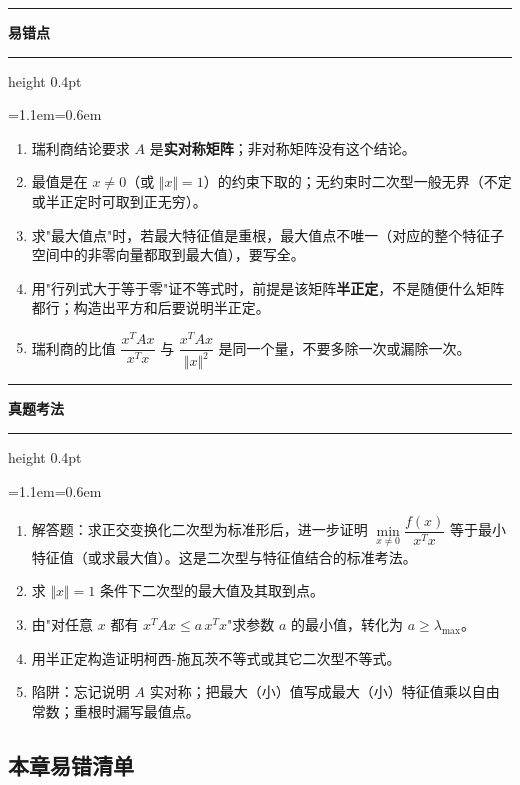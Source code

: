 \documentclass[11pt,openany,UTF8]{ctexbook}
\newcommand{\callouthead}[2]{%
  \par\addvspace{7pt}\noindent
  {\color{#1}\rule[-0.15em]{3pt}{1.05em}}\hspace{0.5em}%
  {\bfseries\color{#1}#2}\par\nobreak\vspace{-0.35em}%
  {\color{rulesep}\hrule height 0.4pt}\nobreak\vspace{0.45em}%
  \begingroup\small\setlength{\parindent}{0pt}%
  \leftskip=1.1em\rightskip=0.6em\noindent\ignorespaces}
\newcommand{\calloutend}{\par\endgroup\addvspace{7pt}}
\newenvironment{callwarn}[1]{\callouthead{warnbar}{#1}}{\calloutend}
\newenvironment{callexam}[1]{\callouthead{exambar}{#1}}{\calloutend}
\begin{document}
\begin{callwarn}{易错点}
\begin{enumerate}
\item 瑞利商结论要求 $A$ 是\textbf{实对称矩阵}；非对称矩阵没有这个结论。
\item 最值是在 $x\neq0$（或 $\Vert x\Vert=1$）的约束下取的；无约束时二次型一般无界（不定或半正定时可取到正无穷）。
\item 求"最大值点"时，若最大特征值是重根，最大值点不唯一（对应的整个特征子空间中的非零向量都取到最大值），要写全。
\item 用"行列式大于等于零"证不等式时，前提是该矩阵\textbf{半正定}，不是随便什么矩阵都行；构造出平方和后要说明半正定。
\item 瑞利商的比值 $\dfrac{x^TAx}{x^Tx}$ 与 $\dfrac{x^TAx}{\Vert x\Vert^2}$ 是同一个量，不要多除一次或漏除一次。
\end{enumerate}
\end{callwarn}

\begin{callexam}{真题考法}
\begin{enumerate}
\item 解答题：求正交变换化二次型为标准形后，进一步证明 $\min\limits_{x\neq0}\dfrac{f(x)}{x^Tx}$ 等于最小特征值（或求最大值）。这是二次型与特征值结合的标准考法。
\item 求 $\Vert x\Vert=1$ 条件下二次型的最大值及其取到点。
\item 由"对任意 $x$ 都有 $x^TAx\leq a\,x^Tx$"求参数 $a$ 的最小值，转化为 $a\geq\lambda_{\max}$。
\item 用半正定构造证明柯西-施瓦茨不等式或其它二次型不等式。
\item 陷阱：忘记说明 $A$ 实对称；把最大（小）值写成最大（小）特征值乘以自由常数；重根时漏写最值点。
\end{enumerate}
\end{callexam}

\subsection*{本章易错清单}
\end{document}
